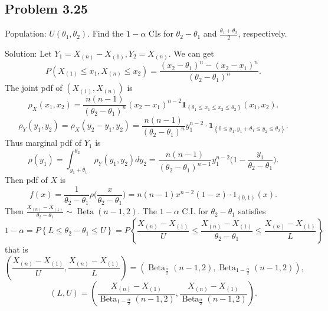 \subsection*{Problem 3.25}
Population: $U\left(\theta_{1},\theta_{2}\right)$.
Find the $1-\alpha$ CIs for $\theta_{2}-\theta_{1}$ and $\frac{\theta_{1}+\theta_{2}}{2}$, respectively.

{Solution:}
Let $Y_{1}=X_{(n)}-X_{(1)},Y_{2}=X_{(n)}$. We can get
\[
P\left(X_{(1)}\leq x_{1},X_{(n)}\leq x_{2}\right)=\frac{\left(x_{2}-\theta_{1}\right)^{n}-\left(x_{2}-x_{1}\right)^{n}}{\left(\theta_{2}-\theta_{1}\right)^{n}}.
\]
The joint pdf of $\left(X_{(1)},X_{(n)}\right)$ is
\[
\rho_{X}\left(x_{1},x_{2}\right)=\frac{n(n-1)}{\left(\theta_{2}-\theta_{1}\right)^{n}}\left(x_{2}-x_{1}\right)^{n-2}\mathbf{1}_{\left\{\theta_{1}\leq x_{1}\leq x_{2}\leq\theta_{2}\right\}}\left(x_{1},x_{2}\right).
\]
\[
\rho_{Y}\left(y_{1},y_{2}\right)=\rho_{X}\left(y_{2}-y_{1},y_{2}\right)=\frac{n(n-1)}{\left(\theta_{2}-\theta_{1}\right)^{n}}y_{1}^{n-2}\cdot\mathbf{1}_{\left\{0\leq y_{1},y_{1}+\theta_{1}\leq y_{2}\leq\theta_{2}\right\}}.
\]
Thus marginal pdf of $Y_{1}$ is
\[
\rho\left(y_{1}\right)=\int_{y_{1}+\theta_{1}}^{\theta_{2}}\rho_{Y}\left(y_{1},y_{2}\right)dy_{2}=\frac{n(n-1)}{(\theta_{2}-\theta_{1})^{n-1}}y_{1}^{n-2}\bigg(1-\frac{y_{1}}{\theta_{2}-\theta_{1}}\bigg).
\]
Then pdf of $X$ is
\[
f(x)=\frac{1}{\theta_{2}-\theta_{1}}\rho\bigg(\frac{x}{\theta_{2}-\theta_{1}}\bigg)=n(n-1)x^{n-2}(1-x)\cdot 1_{\left(0,1\right)}(x).
\]
Then $\frac{X_{(n)}-X_{(1)}}{\theta_{2}-\theta_{1}}\sim\operatorname{Beta}(n-1,2)$. The $1-\alpha$ C.I. for $\theta_{2}-\theta_{1}$ satisfies
\[
1-\alpha=P\left\{L\leq\theta_{2}-\theta_{1}\leq U\right\}=P\left\{\frac{X_{(n)}-X_{(1)}}{U}\leq\frac{X_{(n)}-X_{(1)}}{\theta_{2}-\theta_{1}}\leq\frac{X_{(n)}-X_{(1)}}{L}\right\}
\]
that is
\[
\left(\frac{X_{(n)}-X_{(1)}}{U},\frac{X_{(n)}-X_{(1)}}{L}\right)=\left(\operatorname{Beta}_{\frac{\alpha}{2}}(n-1,2),\operatorname{Beta}_{1-\frac{\alpha}{2}}(n-1,2)\right),
\]
\[
(L,U)=\left(\frac{X_{(n)}-X_{(1)}}{\operatorname{Beta}_{1-\frac{\alpha}{2}}(n-1,2)},\frac{X_{(n)}-X_{(1)}}{\operatorname{Beta}_{\frac{\alpha}{2}}(n-1,2)}\right).
\]


